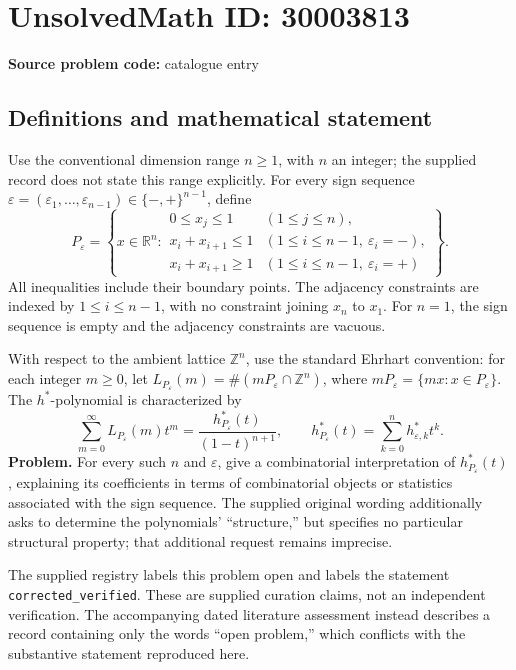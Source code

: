 \documentclass[11pt]{article}
\newcommand{\Z}{\mathbb{Z}}
\newcommand{\R}{\mathbb{R}}
\begin{document}
\section*{UnsolvedMath ID: 30003813}
\textbf{Source problem code:} catalogue entry
\subsection{Definitions and mathematical statement}
Use the conventional dimension range \(n\geq 1\), with \(n\) an integer; the supplied record does not state this range explicitly. For every sign sequence \(\varepsilon=(\varepsilon_1,\ldots,\varepsilon_{n-1})\in\{-,+\}^{n-1}\), define
\[
P_{\varepsilon}=\left\{x\in\R^n:\begin{array}{ll}
0\leq x_j\leq 1 & (1\leq j\leq n),\\
x_i+x_{i+1}\leq 1 & (1\leq i\leq n-1,\ \varepsilon_i=-),\\
x_i+x_{i+1}\geq 1 & (1\leq i\leq n-1,\ \varepsilon_i=+)
\end{array}\right\}.
\]
All inequalities include their boundary points. The adjacency constraints are indexed by \(1\leq i\leq n-1\), with no constraint joining \(x_n\) to \(x_1\). For \(n=1\), the sign sequence is empty and the adjacency constraints are vacuous.

With respect to the ambient lattice \(\Z^n\), use the standard Ehrhart convention: for each integer \(m\geq0\), let \(L_{P_{\varepsilon}}(m)=\#(mP_{\varepsilon}\cap\Z^n)\), where \(mP_{\varepsilon}=\{mx:x\in P_{\varepsilon}\}\). The \(h^*\)-polynomial is characterized by
\[
\sum_{m=0}^{\infty}L_{P_{\varepsilon}}(m)t^m
=\frac{h^*_{P_{\varepsilon}}(t)}{(1-t)^{n+1}},
\qquad
h^*_{P_{\varepsilon}}(t)=\sum_{k=0}^{n}h^*_{\varepsilon,k}t^k.
\]
\textbf{Problem.} For every such \(n\) and \(\varepsilon\), give a combinatorial interpretation of \(h^*_{P_{\varepsilon}}(t)\), explaining its coefficients in terms of combinatorial objects or statistics associated with the sign sequence. The supplied original wording additionally asks to determine the polynomials' ``structure,'' but specifies no particular structural property; that additional request remains imprecise.

The supplied registry labels this problem open and labels the statement \texttt{corrected\_verified}. These are supplied curation claims, not an independent verification. The accompanying dated literature assessment instead describes a record containing only the words ``open problem,'' which conflicts with the substantive statement reproduced here.
\end{document}
